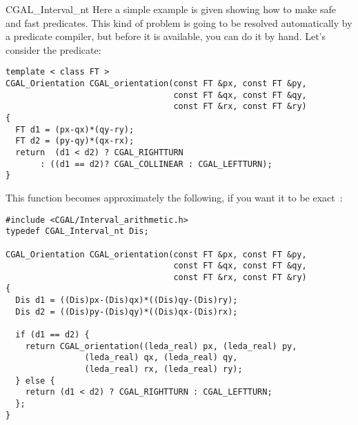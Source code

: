 \begin{ccClass} {CGAL_Interval_nt}
Here a simple example is given showing how to make safe and fast predicates.
This kind of problem is going to be resolved automatically by a predicate
compiler, but before it is available, you can do it by hand.
Let's consider the  predicate:

\begin{verbatim}
template < class FT >
CGAL_Orientation CGAL_orientation(const FT &px, const FT &py,
                                  const FT &qx, const FT &qy,
                                  const FT &rx, const FT &ry)
{
  FT d1 = (px-qx)*(qy-ry);
  FT d2 = (py-qy)*(qx-rx);
  return  (d1 < d2) ? CGAL_RIGHTTURN
       : ((d1 == d2)? CGAL_COLLINEAR : CGAL_LEFTTURN);
}
\end{verbatim}

This function becomes approximately the following, if you want it to be exact~:

\begin{verbatim}
#include <CGAL/Interval_arithmetic.h>
typedef CGAL_Interval_nt Dis;

CGAL_Orientation CGAL_orientation(const FT &px, const FT &py,
                                  const FT &qx, const FT &qy,
                                  const FT &rx, const FT &ry)
{
  Dis d1 = ((Dis)px-(Dis)qx)*((Dis)qy-(Dis)ry);
  Dis d2 = ((Dis)py-(Dis)qy)*((Dis)qx-(Dis)rx);

  if (d1 == d2) {
    return CGAL_orientation((leda_real) px, (leda_real) py,
			    (leda_real) qx, (leda_real) qy,
			    (leda_real) rx, (leda_real) ry);
  } else {
    return (d1 < d2) ? CGAL_RIGHTTURN : CGAL_LEFTTURN;
  };
}
\end{verbatim}

\end{ccClass}

